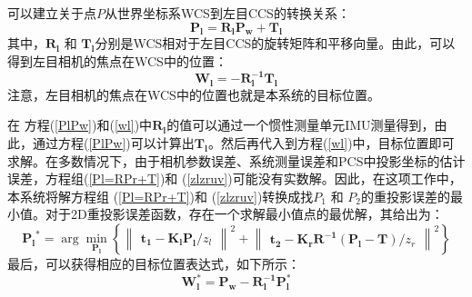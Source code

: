 可以建立关于点$P$从世界坐标系WCS到左目CCS的转换关系：
\begin{equation}\label{PlPw}
\mathbf{P_{l}=R_{l}P_{w}+T_{l}}
\end{equation}
其中，$\mathbf{R_{l}}$ 和 $\mathbf{T_{l}}$分别是WCS相对于左目CCS的旋转矩阵和平移向量。由此，可以得到左目相机的焦点在WCS中的位置：
\begin{equation}\label{wl}
\mathbf{W_{l}=-R_{l}^{-1}T_{l}}
\end{equation}
注意，左目相机的焦点在WCS中的位置也就是本系统的目标位置。

在 方程(\ref{PlPw})和(\ref{wl})中$\mathbf{R_{l}}$的值可以通过一个惯性测量单元IMU测量得到，由此，通过方程(\ref{PlPw})可以计算出$\mathbf{T_{l}}$。然后再代入到方程(\ref{wl})中，目标位置即可求解。在多数情况下，由于相机参数误差、系统测量误差和PCS中投影坐标的估计误差，方程组(\ref{Pl=RPr+T})和 (\ref{zlzruv})可能没有实数解。因此，在这项工作中，本系统将解方程组 (\ref{Pl=RPr+T})和 (\ref{zlzruv})转换成找$P_{1}$ 和 $P_{2}$的重投影误差的最小值。对于2D重投影误差函数，存在一个求解最小值点的最优解，其给出为：
\begin{equation}\label{pl^*}
\mathbf{P_{l}}^\ast = \arg\min _{\mathbf{P_{l}}} \left \{ 
\begin{Vmatrix}
\mathbf{t_{1}-K_{l}P_{l}}/z_{l}
\end{Vmatrix}^{2}
+
\begin{Vmatrix}
\mathbf{t_{2}-K_{r}R^{-1}(P_{l}-T)}/z_{r}
\end{Vmatrix}^{2}
\right \} 
\end{equation}
最后，可以获得相应的目标位置表达式，如下所示：
\begin{equation}\label{wl*}
\mathbf{W_{l}^{*}=P_{w}-R_{l}^{-1}P_{l}^{*}}
\end{equation}

